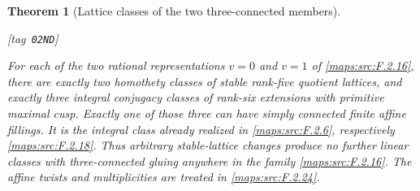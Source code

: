 \documentclass[11pt,a4paper]{article}
\numberwithin{equation}{section}
\newtheorem{theorem}{Theorem}[section]
\theoremstyle{definition}
\newcommand{\StatementRecord}[4]{{\upshape\footnotesize[tag~\texttt{#3}]}\enspace\ignorespaces}
\begin{document}
\begin{theorem}[Lattice classes of the two three-connected members]\hypertarget{tag-02ND}{}\label{maps:src:F.2.23}
\StatementRecord{maps:src:F.2.23}{proved}{02ND}{\cref{maps:src:F.2.16}, \cref{maps:src:F.2.6}, \cref{maps:src:F.2.18}, \eqref{maps:eq:F.U1}, \eqref{maps:eq:F.L4}, \eqref{maps:eq:F.L5}, \eqref{maps:eq:F.L6}, \eqref{maps:eq:F.L7}, \cref{maps:src:F.2.12}, \eqref{maps:eq:F.L10}, \eqref{maps:eq:F.U6}, \cref{maps:src:F.2.19}}


For each of the two rational representations $v=0$ and $v=1$
of \ref{maps:src:F.2.16}, there are exactly two homothety classes of stable
rank-five quotient lattices, and exactly three integral
conjugacy classes of rank-six extensions with primitive
maximal cusp.  Exactly one of those three can have simply
connected finite affine fillings.  It is the integral class
already realized in \ref{maps:src:F.2.6}, respectively \ref{maps:src:F.2.18}.
Thus arbitrary stable-lattice changes produce no further
linear classes with three-connected gluing anywhere in the family \ref{maps:src:F.2.16}.
The affine twists and multiplicities are treated in \cref{maps:src:F.2.24}.

\end{theorem}
\end{document}
